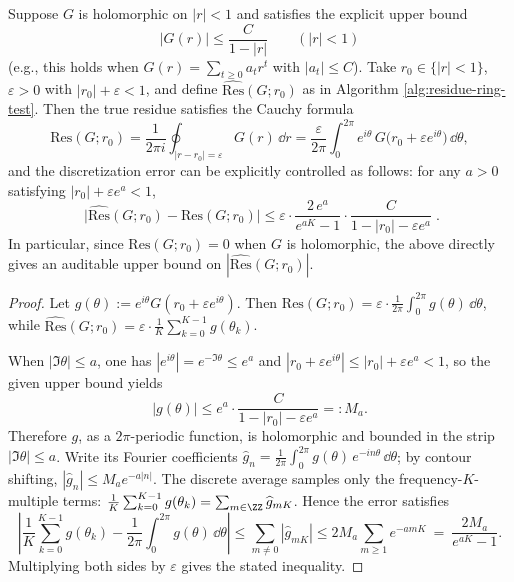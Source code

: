 \begin{proposition}[Explicit error bound for the discrete residue estimate (given by \texorpdfstring{$|G(r)|\le C/(1-|r|)$}{|G(r)|<=C/(1-|r|)})]\label{prop:residue-ring-explicit-error-bound}
Suppose \(G\) is holomorphic on \(|r|<1\) and satisfies the explicit upper bound
\[
|G(r)|\le \frac{C}{1-|r|}\qquad(|r|<1)
\]
(e.g., this holds when \(G(r)=\sum_{t\ge 0}a_t r^t\) with \(|a_t|\le C\)).
Take \(r_0\in\{|r|<1\}\), \(\varepsilon>0\) with \(|r_0|+\varepsilon<1\), and define \(\widehat{\mathrm{Res}}(G;r_0)\) as in Algorithm \ref{alg:residue-ring-test}.
Then the true residue satisfies the Cauchy formula
\[
\mathrm{Res}(G;r_0)=\frac{1}{2\pi i}\oint_{|r-r_0|=\varepsilon}G(r)\,\dd r
=\frac{\varepsilon}{2\pi}\int_0^{2\pi} e^{i\theta}\,G\!\bigl(r_0+\varepsilon e^{i\theta}\bigr)\,\dd\theta,
\]
and the discretization error can be explicitly controlled as follows: for any \(a>0\) satisfying \(|r_0|+\varepsilon e^{a}<1\),
\[
\boxed{\;
\bigl|\widehat{\mathrm{Res}}(G;r_0)-\mathrm{Res}(G;r_0)\bigr|
\le
\varepsilon\cdot
\frac{2\,e^{a}}{e^{aK}-1}\cdot
\frac{C}{1-|r_0|-\varepsilon e^{a}}\; }.
\]
In particular, since \(\mathrm{Res}(G;r_0)=0\) when \(G\) is holomorphic, the above directly gives an auditable upper bound on
\(
|\widehat{\mathrm{Res}}(G;r_0)|
\).
\end{proposition}
\begin{proof}
Let \(g(\theta):=e^{i\theta}G(r_0+\varepsilon e^{i\theta})\).
Then \(\mathrm{Res}(G;r_0)=\varepsilon\cdot \frac{1}{2\pi}\int_0^{2\pi}g(\theta)\,\dd\theta\), while \(\widehat{\mathrm{Res}}(G;r_0)=\varepsilon\cdot \frac{1}{K}\sum_{k=0}^{K-1}g(\theta_k)\).
\par
When \(|\Im\theta|\le a\), one has \(|e^{i\theta}|=e^{-\Im\theta}\le e^{a}\) and
\(
|r_0+\varepsilon e^{i\theta}|
\le
|r_0|+\varepsilon e^{a}
<1
\),
so the given upper bound yields
\[
|g(\theta)|\le e^{a}\cdot \frac{C}{1-|r_0|-\varepsilon e^{a}}
 =: M_a.
\]
Therefore \(g\), as a \(2\pi\)-periodic function, is holomorphic and bounded in the strip \(|\Im\theta|\le a\).
Write its Fourier coefficients \(\widehat g_n=\frac{1}{2\pi}\int_0^{2\pi} g(\theta)\,e^{-in\theta}\,\dd\theta\); by contour shifting,
\(
|\widehat g_n|\le M_a e^{-a|n|}
\).
The discrete average samples only the frequency-\(K\)-multiple terms: \(\frac{1}{K}\sum_{k=0}^{K-1} g(\theta_k)=\sum_{m\in\ZZ}\widehat g_{mK}\).
Hence the error satisfies
\[
\left|
\frac{1}{K}\sum_{k=0}^{K-1} g(\theta_k)-\frac{1}{2\pi}\int_0^{2\pi}g(\theta)\,\dd\theta
\right|
\le
\sum_{m\ne 0} |\widehat g_{mK}|
\le
2M_a\sum_{m\ge 1} e^{-amK}
\ =\ \frac{2M_a}{e^{aK}-1}.
\]
Multiplying both sides by \(\varepsilon\) gives the stated inequality.
\end{proof}

